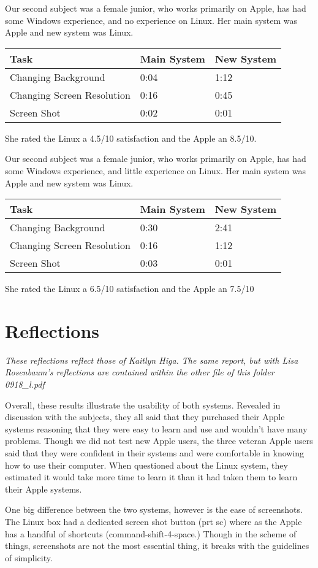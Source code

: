 \documentclass[12pt, onesided, letterpaper]{report}
\begin{document}
Our second subject was a female junior, who works primarily on Apple, has had some Windows experience, and no experience on Linux.  Her main system was Apple and new system was Linux.
\begin{center}
    \begin{tabular}{ | l | l | l |}
    \hline
    Task &Main System & New System  \\ \hline
    Changing Background & 0:04 & 1:12  \\ \hline
    Changing Screen Resolution & 0:16 & 0:45  \\ \hline
    Screen Shot & 0:02 & 0:01 \\
    \hline
    \end{tabular}
\end{center}
She rated the Linux a 4.5/10 satisfaction and the Apple an 8.5/10.

Our second subject was a female junior, who works primarily on Apple, has had some Windows experience, and little experience on Linux. Her main system was Apple and new system was Linux.
\begin{center}
    \begin{tabular}{ | l | l | l |}
    \hline
    Task &Main System & New System  \\ \hline
    Changing Background & 0:30 & 2:41  \\ \hline
    Changing Screen Resolution & 0:16 & 1:12  \\ \hline
    Screen Shot & 0:03 & 0:01 \\
    \hline
    \end{tabular}
\end{center}
She rated the Linux a 6.5/10 satisfaction and the Apple an 7.5/10
\pagebreak
\section*{Reflections}
\textit{These reflections reflect those of Kaitlyn Higa.  The same report, but with Lisa Rosenbaum's reflections are contained within the other file of this folder 0918\_l.pdf}

Overall, these results illustrate the usability of both systems.  Revealed in discussion with the subjects, they all said that they purchased their Apple systems reasoning that they were easy to learn and use and wouldn't have many problems.  Though we did not test new Apple users, the three veteran Apple users said that they were confident in their systems and were comfortable in knowing how to use their computer. When questioned about the Linux system, they estimated it would take more time to learn it than it had taken them to learn their Apple systems.

One big difference between the two systems, however is the ease of screenshots.  The Linux box had a dedicated screen shot button (prt sc) where as the Apple has a handful of shortcuts (command-shift-4-space.)  Though in the scheme of things, screenshots are not the most essential thing, it breaks with the guidelines of simplicity.
\end{document}
